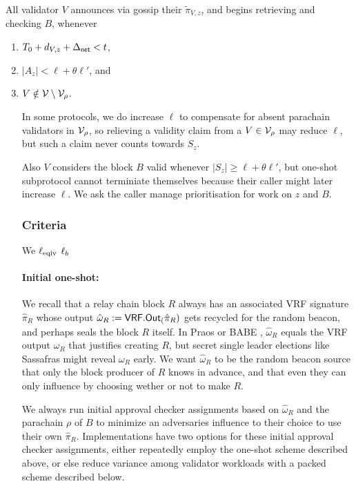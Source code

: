 All validator $V$ announces via gossip their $\tilde{\pi}_{V,z}$, and begins retrieving and checking $B$, whenever
\begin{enumerate}
\item $T_0 + d_{V,z} + \Delta_{\mathsf{net}} < t$,
\item $|A_z| < \ell + \theta \ell'$, and
\item $V \notin \mathcal{V} \setminus \mathcal{V}_\rho$.
\begin{enumerate}
In some protocols, we do increase $\ell$ to compensate for absent parachain validators in $\mathcal{V}_\rho$, so relieving a validity claim from a $V \in \mathcal{V}_\rho$ may reduce $\ell$, but such a claim never counts towards $S_z$.

Also $V$ considers the block $B$ valid whenever $|S_z| \ge \ell + \theta \ell'$, but one-shot subprotocol cannot terminiate themselves because their caller might later increase $\ell$.  We ask the caller manage prioritisation for work on $z$ and $B$.

\subsubsection{Criteria}

We 
$\ell_{\mathrm{eqiv}}$
$\ell_b$

\smallskip
\paragraph{Initial one-shot:}


We recall that a relay chain block $R$ always has an associated VRF signature $\hat{\pi}_R$ whose output $\hat{\omega}_R := \mathsf{VRF}.\mathsf{Out}_(\hat{\pi}_R)$ gets recycled for the random beacon, and perhaps seals the block $R$ itself.  In Praos \cite{Praos} or BABE \cite{BABE}, $\hat{\omega}_R$ equals the VRF output $\omega_R$ that justifies creating $R$, but secret single leader elections like Sassafras \cite{Sassafras} might reveal $\omega_R$ early.  We want $\hat{\omega}_R$ to be the random beacon source that only the block producer of $R$ knows in advance, and that even they can only influence by choosing wether or not to make $R$.

We always run initial approval checker assignments based on $\hat{\omega}_R$ and the parachain $\rho$ of $B$ to minimize an adversaries influence to their choice to use their own $\hat{\pi}_R$.  Implementations have two options for these initial approval checker assignments, either repeatedly employ the one-shot scheme described above, or else reduce variance among validator workloads with a packed scheme described below.


\end{enumerate}
\end{enumerate}
